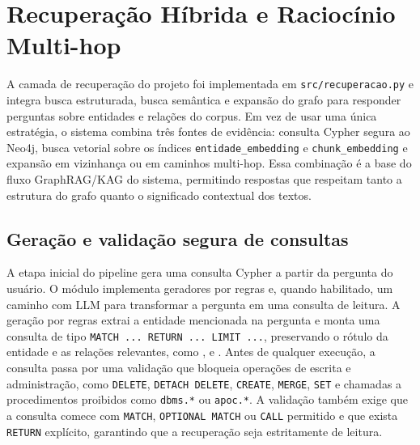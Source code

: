 %
%

\section{Recuperação Híbrida e Raciocínio Multi-hop}
\label{sec:recuperacao}

A camada de recuperação do projeto foi implementada em \texttt{src/recuperacao.py} e integra busca estruturada, busca semântica e expansão do grafo para responder perguntas sobre entidades e relações do corpus. Em vez de usar uma única estratégia, o sistema combina três fontes de evidência: consulta Cypher segura ao Neo4j, busca vetorial sobre os índices \texttt{entidade\_embedding} e \texttt{chunk\_embedding} e expansão em vizinhança ou em caminhos multi-hop. Essa combinação é a base do fluxo GraphRAG/KAG do sistema, permitindo respostas que respeitam tanto a estrutura do grafo quanto o significado contextual dos textos.

\subsection{Geração e validação segura de consultas}

A etapa inicial do pipeline gera uma consulta Cypher a partir da pergunta do usuário. O módulo implementa geradores por regras e, quando habilitado, um caminho com LLM para transformar a pergunta em uma consulta de leitura. A geração por regras extrai a entidade mencionada na pergunta e monta uma consulta de tipo \texttt{MATCH ... RETURN ... LIMIT ...}, preservando o rótulo da entidade e as relações relevantes, como ,  e . Antes de qualquer execução, a consulta passa por uma validação que bloqueia operações de escrita e administração, como \texttt{DELETE}, \texttt{DETACH DELETE}, \texttt{CREATE}, \texttt{MERGE}, \texttt{SET} e chamadas a procedimentos proibidos como \texttt{dbms.*} ou \texttt{apoc.*}. A validação também exige que a consulta comece com \texttt{MATCH}, \texttt{OPTIONAL MATCH} ou \texttt{CALL} permitido e que exista \texttt{RETURN} explícito, garantindo que a recuperação seja estritamente de leitura.

